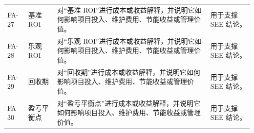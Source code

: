 \documentclass[12pt,a4paper]{ctexart}
\begin{document}
\begin{longtable}{L{1.7cm}L{4.0cm}L{6.4cm}L{3.4cm}}
FA-27 & 基准 ROI & 对“基准 ROI”进行成本或收益解释，并说明它如何影响项目投入、维护费用、节能收益或管理价值。 & 用于支撑 SEE 结论。 \\
FA-28 & 乐观 ROI & 对“乐观 ROI”进行成本或收益解释，并说明它如何影响项目投入、维护费用、节能收益或管理价值。 & 用于支撑 SEE 结论。 \\
FA-29 & 回收期 & 对“回收期”进行成本或收益解释，并说明它如何影响项目投入、维护费用、节能收益或管理价值。 & 用于支撑 SEE 结论。 \\
FA-30 & 盈亏平衡点 & 对“盈亏平衡点”进行成本或收益解释，并说明它如何影响项目投入、维护费用、节能收益或管理价值。 & 用于支撑 SEE 结论。 \\
\bottomrule
\end{longtable}
\end{document}
